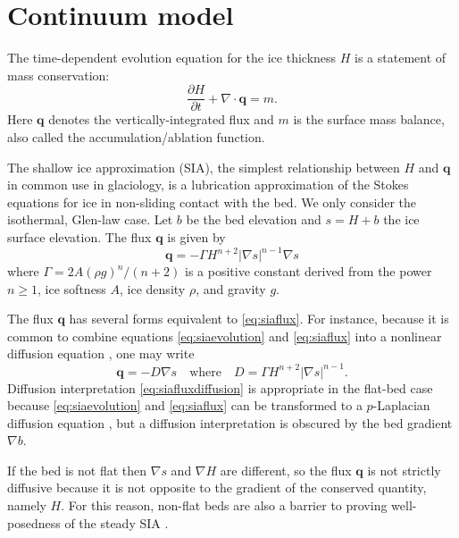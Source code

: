 \documentclass[review,letterpaper]{igs}
\newcommand\bq{\mathbf{q}}
\newcommand{\Div}{\nabla\cdot}
\newcommand{\grad}{\nabla}
\begin{document}
\section{Continuum model}

The time-dependent evolution equation for the ice thickness $H$ is a statement of mass conservation:
\begin{equation}
\frac{\partial H}{\partial t} + \Div \bq = m.  \label{eq:siaevolution}
\end{equation}
Here $\bq$ denotes the vertically-integrated flux and $m$ is the surface mass balance, also called the accumulation/ablation function.

The shallow ice approximation (SIA), the simplest relationship between $H$ and $\bq$ in common use in glaciology, is a lubrication approximation \citep{Fowler1997} of the Stokes equations for ice in non-sliding contact with the bed.  We only consider the isothermal, Glen-law \citep{GreveBlatter2009} case.  Let $b$ be the bed elevation and $s = H+b$ the ice surface elevation.  The flux $\bq$ is given by
\begin{equation}
\bq = - \Gamma H^{n+2} |\grad s|^{n-1} \grad s  \label{eq:siaflux}
\end{equation}
where $\Gamma = 2 A (\rho g)^n / (n+2)$ is a positive constant derived from the power $n\ge 1$, ice softness $A$, ice density $\rho$, and gravity $g$.

The flux $\bq$ has several forms equivalent to \eqref{eq:siaflux}.  For instance, because it is common to combine equations \eqref{eq:siaevolution} and \eqref{eq:siaflux} into a nonlinear diffusion equation \citep{Huybrechtsetal1996}, one may write
\begin{equation}
\bq = - D \grad s \quad \text{where} \quad D =  \Gamma H^{n+2} |\grad s|^{n-1}. \label{eq:siafluxdiffusion}
\end{equation}
Diffusion interpretation \eqref{eq:siafluxdiffusion} is appropriate in the flat-bed case because \eqref{eq:siaevolution} and \eqref{eq:siaflux} can be transformed to a $p$-Laplacian diffusion equation \citep{Calvoetal2002}, but a diffusion interpretation is obscured by the bed gradient $\grad b$.

If the bed is not flat then $\grad s$ and $\grad H$ are different, so the flux $\bq$ is not strictly diffusive because it is not opposite to the gradient of the conserved quantity, namely $H$.  For this reason, non-flat beds are also a barrier to proving well-posedness of the steady SIA  \citep{JouvetBueler2012}.
\end{document}
